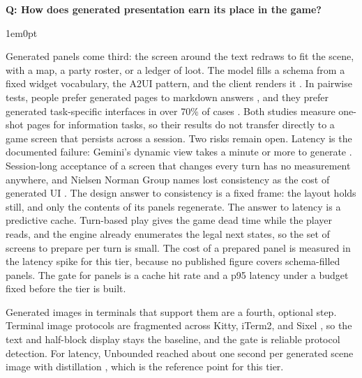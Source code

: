 \documentclass[11pt,letterpaper]{article}
\newcounter{faqnum}
\newenvironment{faqpair}[1]{%
  \needspace{4\baselineskip}\vspace{0.5em}\refstepcounter{faqnum}%
  \noindent\textbf{\color{SectionBlue}Q\thefaqnum: #1}\par\nopagebreak[4]%
  \vspace{0.2em}\begin{adjustwidth}{1em}{0pt}\setlength{\parindent}{0pt}%
}{\end{adjustwidth}\vspace{0.5em}}
\begin{document}
\begin{faqpair}{How does generated presentation earn its place in the game?}
Generated panels come third: the screen around the text redraws to fit the
scene, with a map, a party roster, or a ledger of loot. The model fills a
schema from a fixed widget vocabulary, the A2UI pattern, and the client
renders it \cite{google2025a2ui}. In pairwise tests, people prefer
generated pages to markdown answers \cite{leviathan2026generativeui}, and
they prefer generated task-specific interfaces in over 70\% of cases
\cite{chen2025generativeinterfaces}. Both studies measure one-shot pages
for information tasks, so their results do not transfer directly to a game
screen that persists across a session. Two risks remain open. Latency is the
documented failure: Gemini's dynamic view takes a minute or more to
generate \cite{google2025genui}. Session-long acceptance of a screen that
changes every turn has no measurement anywhere, and Nielsen Norman Group
names lost consistency as the cost of generated UI
\cite{nng2024generativeui}. The design answer to consistency is a fixed
frame: the layout holds still, and only the contents of its panels
regenerate. The answer to latency is a predictive cache. Turn-based play
gives the game dead time while the player reads, and the engine already
enumerates the legal next states, so the set of screens to prepare per turn
is small. The cost of a prepared panel is measured in the latency spike
for this tier, because no published figure covers schema-filled panels. The
gate for panels is a cache hit rate and a p95 latency under a budget fixed
before the tier is built.

Generated images in terminals that support them are a fourth, optional
step. Terminal image protocols are fragmented across Kitty, iTerm2, and
Sixel \cite{kitty2026graphics,iterm2images,arewesixelyet}, so the text and
half-block display stays the baseline, and the gate is reliable protocol
detection. For latency, Unbounded reached about one second per generated
scene image with distillation \cite{li2025unbounded}, which is the
reference point for this tier.
\end{faqpair}
\end{document}
